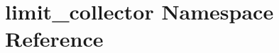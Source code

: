 \hypertarget{namespacelimit__collector}{
\section{limit\_\-collector Namespace Reference}
\label{namespacelimit__collector}
}
